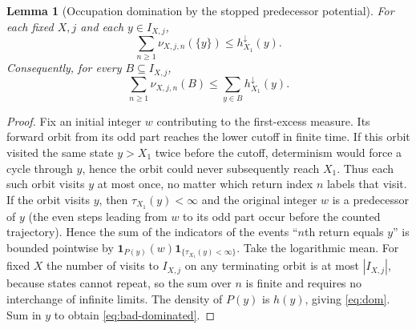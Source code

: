 \documentclass[11pt,a4paper]{article}
\newtheorem{lemma}{Lemma}
\newcommand{\1}{\mathbf 1}
\begin{document}
\begin{lemma}[Occupation domination by the stopped predecessor potential]\label{lem:occupation}
For each fixed $X,j$ and each $y\in I_{X,j}$,
\begin{equation}\label{eq:dom}
 \sum_{n\ge1}\nu_{X,j,n}(\{y\})\le h^{\downarrow}_{X_1}(y).
\end{equation}
Consequently, for every $B\subseteq I_{X,j}$,
\begin{equation}\label{eq:bad-dominated}
 \sum_{n\ge1}\nu_{X,j,n}(B)\le\sum_{y\in B}h^{\downarrow}_{X_1}(y).
\end{equation}
\end{lemma}
\begin{proof}
Fix an initial integer $w$ contributing to the first-excess measure. Its forward orbit from its odd part reaches the lower cutoff in finite time. If this orbit visited the same state $y>X_1$ twice before the cutoff, determinism would force a cycle through $y$, hence the orbit could never subsequently reach $X_1$. Thus each such orbit visits $y$ at most once, no matter which return index $n$ labels that visit. If the orbit visits $y$, then $\tau_{X_1}(y)<\infty$ and the original integer $w$ is a predecessor of $y$ (the even steps leading from $w$ to its odd part occur before the counted trajectory). Hence the sum of the indicators of the events ``$n$th return equals $y$'' is bounded pointwise by $\1_{P(y)}(w)\1_{\{\tau_{X_1}(y)<\infty\}}$. Take the logarithmic mean. For fixed $X$ the number of visits to $I_{X,j}$ on any terminating orbit is at most $|I_{X,j}|$, because states cannot repeat, so the sum over $n$ is finite and requires no interchange of infinite limits. The density of $P(y)$ is $h(y)$, giving \eqref{eq:dom}. Sum in $y$ to obtain \eqref{eq:bad-dominated}.
\end{proof}
\end{document}
